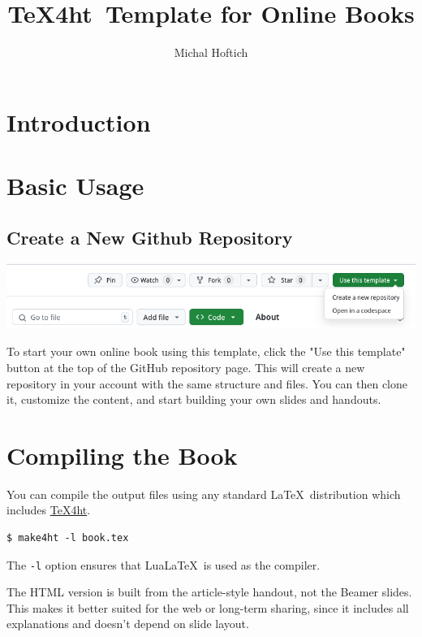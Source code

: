 \documentclass{book}
\begin{document}
\title{\TeX4ht\ Template for Online Books}
\author{Michal Hoftich}
\maketitle
\tableofcontents

\chapter{Introduction}



\chapter{Basic Usage}

\section{Create a New Github Repository}
\includegraphics[width=\textwidth]{img/template-use.png}

To start your own online book using this template, click the "Use this
template" button at the top of the GitHub repository page. This will create a
new repository in your account with the same structure and files. You can then
clone it, customize the content, and start building your own slides and
handouts.






\chapter{Compiling the Book}


You can compile the output files using any standard \LaTeX\ distribution which includes \href{https://www.tug.org/tex4ht/}{\TeX4ht}.

\begin{verbatim}
$ make4ht -l book.tex    
\end{verbatim}

The \verb|-l| option  ensures that Lua\LaTeX\ is used as the compiler. 


The HTML version is built from the article-style handout, not the Beamer slides.
This makes it better suited for the web or long-term sharing, since it includes
all explanations and doesn’t depend on slide layout.
\end{document}
